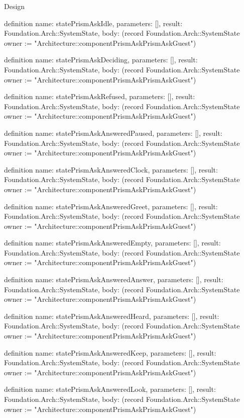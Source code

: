 \begin{lexlean}{Design}
\begin{semanticmodule}
definition{
  name: statePrismAskIdle,
  parameters: [],
  result: Foundation.Arch::SystemState,
  body: (record Foundation.Arch::SystemState {owner := "Architecture::componentPrismAskPrismAskGuest"})
}

definition{
  name: statePrismAskDeciding,
  parameters: [],
  result: Foundation.Arch::SystemState,
  body: (record Foundation.Arch::SystemState {owner := "Architecture::componentPrismAskPrismAskGuest"})
}

definition{
  name: statePrismAskRefused,
  parameters: [],
  result: Foundation.Arch::SystemState,
  body: (record Foundation.Arch::SystemState {owner := "Architecture::componentPrismAskPrismAskGuest"})
}

definition{
  name: statePrismAskAnsweredPaused,
  parameters: [],
  result: Foundation.Arch::SystemState,
  body: (record Foundation.Arch::SystemState {owner := "Architecture::componentPrismAskPrismAskGuest"})
}

definition{
  name: statePrismAskAnsweredClock,
  parameters: [],
  result: Foundation.Arch::SystemState,
  body: (record Foundation.Arch::SystemState {owner := "Architecture::componentPrismAskPrismAskGuest"})
}

definition{
  name: statePrismAskAnsweredGreet,
  parameters: [],
  result: Foundation.Arch::SystemState,
  body: (record Foundation.Arch::SystemState {owner := "Architecture::componentPrismAskPrismAskGuest"})
}

definition{
  name: statePrismAskAnsweredEmpty,
  parameters: [],
  result: Foundation.Arch::SystemState,
  body: (record Foundation.Arch::SystemState {owner := "Architecture::componentPrismAskPrismAskGuest"})
}

definition{
  name: statePrismAskAnsweredAnswer,
  parameters: [],
  result: Foundation.Arch::SystemState,
  body: (record Foundation.Arch::SystemState {owner := "Architecture::componentPrismAskPrismAskGuest"})
}

definition{
  name: statePrismAskAnsweredHeard,
  parameters: [],
  result: Foundation.Arch::SystemState,
  body: (record Foundation.Arch::SystemState {owner := "Architecture::componentPrismAskPrismAskGuest"})
}

definition{
  name: statePrismAskAnsweredKeep,
  parameters: [],
  result: Foundation.Arch::SystemState,
  body: (record Foundation.Arch::SystemState {owner := "Architecture::componentPrismAskPrismAskGuest"})
}

definition{
  name: statePrismAskAnsweredLook,
  parameters: [],
  result: Foundation.Arch::SystemState,
  body: (record Foundation.Arch::SystemState {owner := "Architecture::componentPrismAskPrismAskGuest"})
}


\end{semanticmodule}
\end{lexlean}
